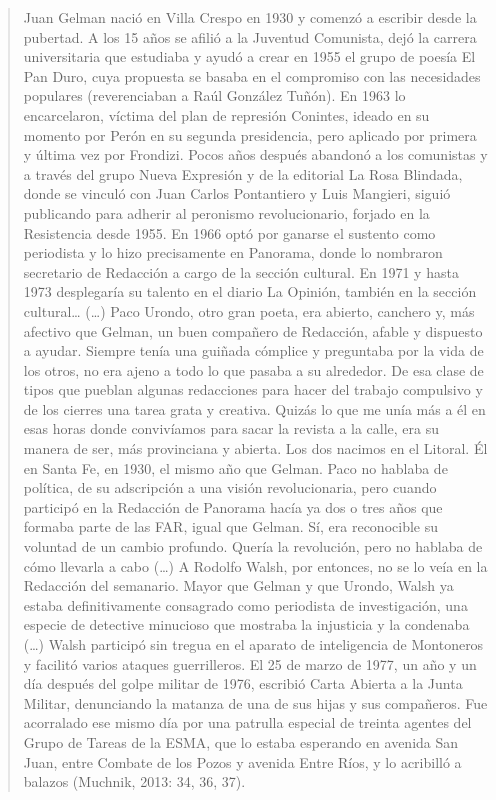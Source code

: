 {\begin{quote}
Juan Gelman nació en Villa Crespo en 1930 y comenzó a escribir desde la pubertad. A los 15 años se afilió a la Juventud Comunista, dejó la carrera universitaria que estudiaba y ayudó a crear en 1955 el grupo de poesía El Pan Duro, cuya propuesta se basaba en el compromiso con las necesidades populares (reverenciaban a Raúl González Tuñón). En 1963 lo encarcelaron, víctima del plan de represión Conintes, ideado en su momento por Perón en su segunda presidencia, pero aplicado por primera y última vez por Frondizi. Pocos años después abandonó a los comunistas y a través del grupo Nueva Expresión y de la editorial La Rosa Blindada, donde se vinculó con Juan Carlos Pontantiero y Luis Mangieri, siguió publicando para adherir al peronismo revolucionario, forjado en la Resistencia desde 1955. En 1966 optó por ganarse el sustento como periodista y lo hizo precisamente en Panorama, donde lo nombraron secretario de Redacción a cargo de la sección cultural. En 1971 y hasta 1973 desplegaría su talento en el diario La Opinión, también en la sección cultural\ldots{} (\ldots) Paco Urondo, otro gran poeta, era abierto, canchero y, más afectivo que Gelman, un buen compañero de Redacción, afable y dispuesto a ayudar. Siempre tenía una guiñada cómplice y preguntaba por la vida de los otros, no era ajeno a todo lo que pasaba a su alrededor. De esa clase de tipos que pueblan algunas redacciones para hacer del trabajo compulsivo y de los cierres una tarea grata y creativa. Quizás lo que me unía más a él en esas horas donde convivíamos para sacar la revista a la calle, era su manera de ser, más provinciana y abierta. Los dos nacimos en el Litoral. Él en Santa Fe, en 1930, el mismo año que Gelman. Paco no hablaba de política, de su adscripción a una visión revolucionaria, pero cuando participó en la Redacción de Panorama hacía ya dos o tres años que formaba parte de las FAR, igual que Gelman. Sí, era reconocible su voluntad de un cambio profundo. Quería la revolución, pero no hablaba de cómo llevarla a cabo (\ldots) A Rodolfo Walsh, por entonces, no se lo veía en la Redacción del semanario. Mayor que Gelman y que Urondo, Walsh ya estaba definitivamente consagrado como periodista de investigación, una especie de detective minucioso que mostraba la injusticia y la condenaba (\ldots) Walsh participó sin tregua en el aparato de inteligencia de Montoneros y facilitó varios ataques guerrilleros. El 25 de marzo de 1977, un año y un día después del golpe militar de 1976, escribió Carta Abierta a la Junta Militar, denunciando la matanza de una de sus hijas y sus compañeros. Fue acorralado ese mismo día por una patrulla especial de treinta agentes del Grupo de Tareas de la ESMA, que lo estaba esperando en avenida San Juan, entre Combate de los Pozos y avenida Entre Ríos, y lo acribilló a balazos (Muchnik, 2013: 34, 36, 37).
\end{quote}

}
